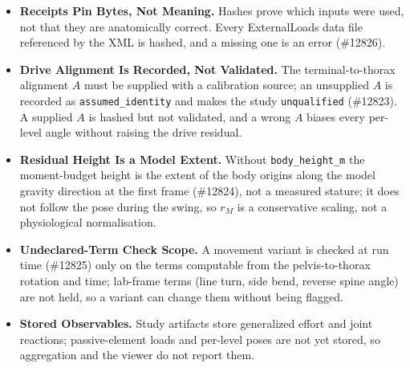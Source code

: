 \documentclass[11pt,a4paper]{article}
\begin{document}
\begin{itemize}
  \item \textbf{Receipts Pin Bytes, Not Meaning.} Hashes prove which inputs were used, not that they are anatomically correct. Every ExternalLoads data file referenced by the XML is hashed, and a missing one is an error (\#12826).
  \item \textbf{Drive Alignment Is Recorded, Not Validated.} The terminal-to-thorax alignment $A$ must be supplied with a calibration source; an unsupplied $A$ is recorded as \texttt{assumed\_identity} and makes the study \texttt{unqualified} (\#12823). A supplied $A$ is hashed but not validated, and a wrong $A$ biases every per-level angle without raising the drive residual.
  \item \textbf{Residual Height Is a Model Extent.} Without \texttt{body\_height\_m} the moment-budget height is the extent of the body origins along the model gravity direction at the first frame (\#12824), not a measured stature; it does not follow the pose during the swing, so $r_M$ is a conservative scaling, not a physiological normalisation.
  \item \textbf{Undeclared-Term Check Scope.} A movement variant is checked at run time (\#12825) only on the terms computable from the pelvis-to-thorax rotation and time; lab-frame terms (line turn, side bend, reverse spine angle) are not held, so a variant can change them without being flagged.
  \item \textbf{Stored Observables.} Study artifacts store generalized effort and joint reactions; passive-element loads and per-level poses are not yet stored, so aggregation and the viewer do not report them.
\end{itemize}
\end{document}
